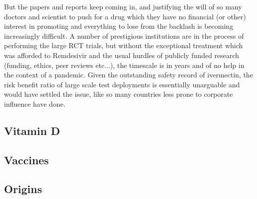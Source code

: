\documentclass[11pt,a4paper]{article}
\begin{document}
But the papers and reports keep coming in, and justifying the will of so many doctors and scientist to push for a drug which they have no financial (or other) interest in promoting and everything to lose from the backlash is becoming increasingly difficult. A number of prestigious institutions are in the process of performing the large RCT trials, but without the exceptional treatment which was afforded to Remdesivir and the usual hurdles of publicly funded research (funding, ethics, peer reviews etc...), the timescale is in years and of no help in the context of a pandemic. Given the outstanding safety record of ivermectin, the risk benefit ratio of large scale test deployments is essentially unarguable and would have settled the issue, like so many countries less prone to corporate influence have done.

\subsection*{Vitamin D}

\subsection*{Vaccines}

\subsection*{Origins}
\end{document}
